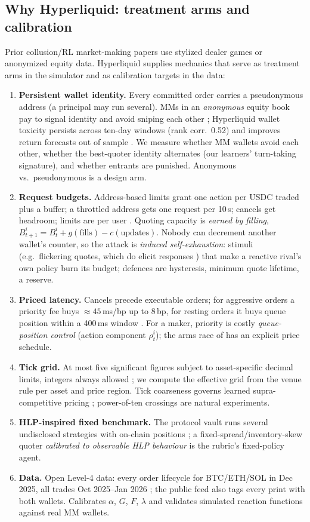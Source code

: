 \documentclass[11pt]{article}
\begin{document}
\subsection*{Why Hyperliquid: treatment arms and calibration}\label{sec:hl}
Prior collusion/RL market-making papers use stylized dealer games or anonymized equity data. Hyperliquid supplies mechanics that serve as treatment arms in the simulator and as calibration targets in the data:
\begin{enumerate}
\item \textbf{Persistent wallet identity.} Every committed order carries a pseudonymous address (a principal may run several). MMs in an \emph{anonymous} equity book pay to signal identity and avoid sniping each other \cite{ccg}; Hyperliquid wallet toxicity persists across ten-day windows (rank corr.\ 0.52) and improves return forecasts out of sample \cite{zhai}. We measure whether MM wallets avoid each other, whether the best-quoter identity alternates (our learners' turn-taking signature), and whether entrants are punished. Anonymous vs.\ pseudonymous is a design arm.
\item \textbf{Request budgets.} Address-based limits grant one action per USDC traded plus a buffer; a throttled address gets one request per 10\,s; cancels get headroom; limits are per user \cite{hldocs}. Quoting capacity is \emph{earned by filling}, $B^i_{t+1}=B^i_t+g(\text{fills})-c(\text{updates})$. Nobody can decrement another wallet's counter, so the attack is \emph{induced self-exhaustion}: stimuli (e.g.\ flickering quotes, which do elicit responses \cite{brogaard}) that make a reactive rival's own policy burn its budget; defences are hysteresis, minimum quote lifetime, a reserve.
\item \textbf{Priced latency.} Cancels precede executable orders; for aggressive orders a priority fee buys $\approx45$\,ms/bp up to 8\,bp, for resting orders it buys queue position within a 400\,ms window \cite{hldocs}. For a maker, priority is costly \emph{queue-position control} (action component $\rho^i_t$); the arms race of \cite{budish} has an explicit price schedule.
\item \textbf{Tick grid.} At most five significant figures subject to asset-specific decimal limits, integers always allowed \cite{hldocs}; we compute the effective grid from the venue rule per asset and price region. Tick coarseness governs learned supra-competitive pricing \cite{ccp}; power-of-ten crossings are natural experiments.
\item \textbf{HLP-inspired fixed benchmark.} The protocol vault runs several undisclosed strategies with on-chain positions \cite{hldocs}; a fixed-spread/inventory-skew quoter \emph{calibrated to observable HLP behaviour} is the rubric's fixed-policy agent.
\item \textbf{Data.} Open Level-4 data: every order lifecycle for BTC/ETH/SOL in Dec 2025, all trades Oct 2025--Jan 2026 \cite{albers}; the public feed also tags every print with both wallets. Calibrates $\alpha$, $G$, $F$, $\lambda$ and validates simulated reaction functions against real MM wallets.
\end{enumerate}
\end{document}
